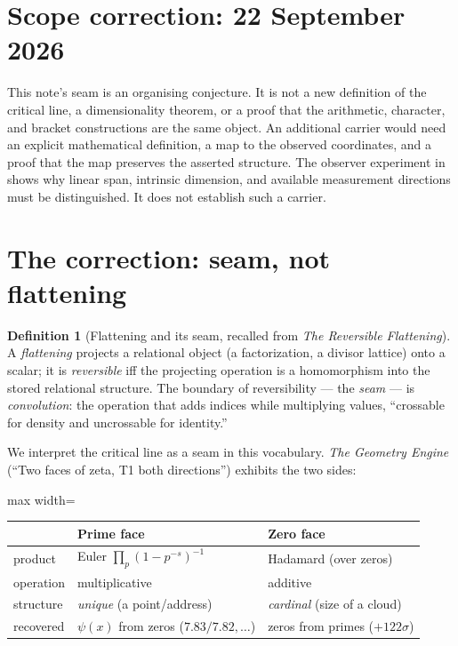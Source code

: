 \documentclass[11pt]{article}
\theoremstyle{definition}
\newtheorem{definition}{Definition}
\theoremstyle{plain}
\begin{document}
\section*{Scope correction: 22 September 2026}
This note's seam is an organising conjecture. It is not a new definition of
the critical line, a dimensionality theorem, or a proof that the arithmetic,
character, and bracket constructions are the same object. An additional
carrier would need an explicit mathematical definition, a map to the observed
coordinates, and a proof that the map preserves the asserted structure.
The observer experiment in  shows why
linear span, intrinsic dimension, and available measurement directions must
be distinguished. It does not establish such a carrier.

\section{The correction: seam, not flattening}\label{sec:correct}

\begin{definition}[Flattening and its seam, recalled from \textit{The Reversible Flattening}]
A \emph{flattening} projects a relational object (a factorization, a divisor lattice) onto a
scalar; it is \emph{reversible} iff the projecting operation is a homomorphism into the stored
relational structure. The boundary of reversibility --- the \emph{seam} --- is \emph{convolution}:
the operation that adds indices while multiplying values, ``crossable for density and uncrossable
for identity.''
\end{definition}

We interpret the critical line as a seam in this vocabulary. \textit{The
Geometry Engine} (``Two faces of zeta, T1 both directions'') exhibits the two sides:

\begin{center}\small
\begin{adjustbox}{max width=\linewidth}\begin{tabular}{@{}lll@{}}
\toprule
 & \textbf{Prime face} & \textbf{Zero face} \\
\midrule
product      & Euler $\prod_p (1-p^{-s})^{-1}$ & Hadamard (over zeros) \\
operation    & multiplicative                  & additive \\
structure    & \emph{unique} (a point/address) & \emph{cardinal} (size of a cloud) \\
recovered    & $\psi(x)$ from zeros ($7.83/7.82,\dots$) & zeros from primes ($+122\sigma$) \\
\bottomrule
\end{tabular}\end{adjustbox}
\end{center}
\end{document}
